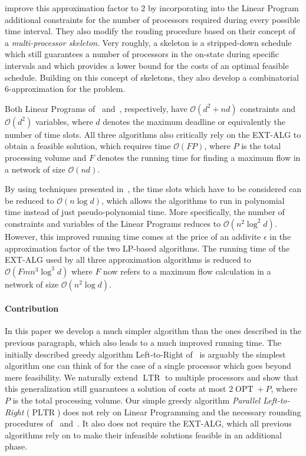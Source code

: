 \documentclass[a4paper]{article}
\DeclareMathOperator{\OPT}{OPT}
\DeclareMathOperator{\PLTR}{PLTR}
\DeclareMathOperator{\LTR}{LTR}
\begin{document}
\cite{skeletons} improve this approximation factor to $2$ by incorporating into the Linear Program additional constraints for the number of processors required during every possible time interval.
They also modify the rouding procedure based on their concept of a \textit{multi-processor skeleton}.
Very roughly, a skeleton is a stripped-down schedule which still guarantees a number of processors in the on-state during specific intervals and which provides a lower bound for the costs of an optimal feasible schedule.
Building on this concept of skeletons, they also develop a combinatorial $6$-approximation for the problem.

Both Linear Programs of~\cite{antoniadis} and~\cite{skeletons}, respectively, have $\mathcal{O}(d^2 + nd)$ constraints and $\mathcal{O}(d^2)$ variables, where $d$ denotes the maximum deadline or equivalently the number of time slots.
All three algorithms also critically rely on the EXT-ALG to obtain a feasible solution, which requires time $\mathcal{O}(FP)$, where $P$ is the total processing volume and $F$ denotes the running time for finding a maximum flow in a network of size $\mathcal{O}(nd)$.

By using techniques presented in~\cite{antoniadis}, the time slots which have to be considered can be reduced to $\mathcal{O}(n \log d)$, which allows the algorithms to run in polynomial time instead of just pseudo-polynomial time.
More specifically, the number of constraints and variables of the Linear Programs reduces to $\mathcal{O}(n^2 \log^2 d)$.
However, this improved running time comes at the price of an addivite $\epsilon$ in the approximation factor of the two LP-based algorithms.
The running time of the EXT-ALG used by all three approximation algorithms is reduced to $\mathcal{O}(F m n^3 \log^3 d)$ where $F$ now refers to a maximum flow calculation in a network of size $\mathcal{O}(n^2 \log d)$.

\paragraph{Contribution}
In this paper we develop a much simpler algorithm than the ones described in the previous paragraph, which also leads to a much improved running time.
The initially described greedy algorithm Left-to-Right of~\cite{irani_left_to_right_soda_2003} is arguably the simplest algorithm one can think of for the case of a single processor which goes beyond mere feasibility.
We naturally extend $\LTR$ to multiple processors and show that this generalization still guarantees a solution of costs at most $2 \OPT + P$, where $P$ is the total processing volume.
Our simple greedy algorithm \textit{Parallel Left-to-Right} ($\PLTR$) does not rely on Linear Programming and the necessary rounding procedures of~\cite{antoniadis} and~\cite{skeletons}.
It also does not require the EXT-ALG, which all previous algorithms rely on to make their infeasible solutions feasible in an additional phase.
\end{document}
